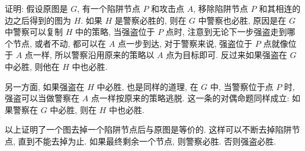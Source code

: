 证明: 假设原图是 $ G $, 有一个陷阱节点 $ P $ 和攻击点 $ A $, 移除陷阱节点 $ P $ 和其相连的边之后得到的图为 $ H $. 如果 $ H $ 是警察必胜的, 则在 $ G $ 中警察也必胜, 原因是在 $ G $ 中警察可以复制 $ H $ 中的策略, 当强盗位于 $ P $ 点时, 注意到无论下一步强盗走到哪个节点, 或者不动, 都可以在 $ A $ 点一步到达, 对于警察来说, 强盗位于 $ P $ 点就像位于 $ A $ 点一样, 所以警察沿用原来的策略以 $ A $ 点为目标即可. 反过来如果强盗在 $ G $ 中必胜, 则他在 $ H $ 中也必胜. 

另一方面, 如果强盗在 $ H $ 中必胜, 也是同样的道理, 在 $ G $ 中, 当警察位于点 $ P $ 时, 强盗可以当做警察在
$ A $ 点一样按原来的策略逃脱. 这一条的对偶命题同样成立: 如果警察在 $ G $ 中必胜, 则在 $ H $ 中也必胜.

以上证明了一个图去掉一个陷阱节点后与原图是等价的. 这样可以不断去掉陷阱节点, 直到不能去掉为止. 如果最终剩余一个节点, 则警察必胜. 否则强盗必胜.

\newpage

